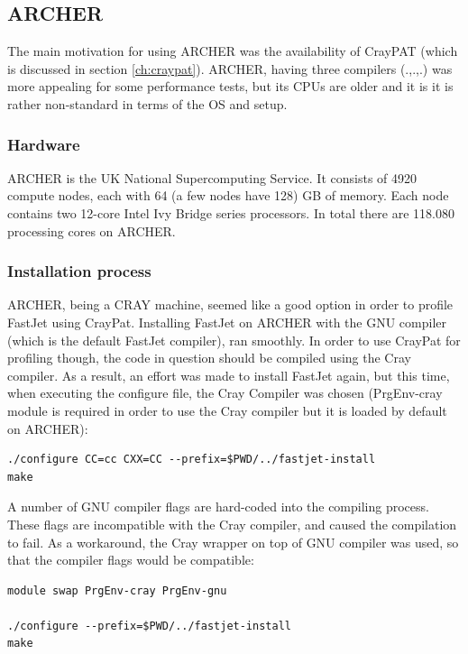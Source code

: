 \subsection{ARCHER}\label{ch:fj-ARCHER}
The main motivation for using ARCHER was the availability of CrayPAT (which is discussed in section \ref{ch:craypat}). ARCHER, having three compilers (.,.,.) was more appealing for some performance tests, but its CPUs are older and it is it is rather non-standard in terms of the OS and setup.



\subsubsection{Hardware}
ARCHER \cite{ARCHER} is the UK National Supercomputing Service. It consists of 4920 compute nodes, each with 64 (a few nodes have 128) GB of memory. Each node contains two 12-core Intel Ivy Bridge series processors. In total there are 118.080 processing cores on ARCHER.

\subsubsection{Installation process}
ARCHER, being a CRAY machine, seemed like a good option in order to profile FastJet using CrayPat. Installing FastJet on ARCHER with the GNU compiler (which is the default FastJet compiler), ran smoothly. In order to use CrayPat for profiling though, the code in question should be compiled using the Cray compiler. As a result, an effort was made to install FastJet again, but this time, when executing the configure file, the Cray Compiler was chosen (PrgEnv-cray module is required in order to use the Cray compiler but it is loaded by default on ARCHER):

\begin{lstlisting}
./configure CC=cc CXX=CC --prefix=$PWD/../fastjet-install
make
\end{lstlisting}

A number of GNU compiler flags are hard-coded into the compiling process. These flags are incompatible with the Cray compiler, and caused the compilation to fail.  As a workaround, the Cray wrapper on top of GNU compiler was used, so that the compiler flags would be compatible:
\begin{lstlisting}
module swap PrgEnv-cray PrgEnv-gnu

./configure --prefix=$PWD/../fastjet-install
make
\end{lstlisting}

